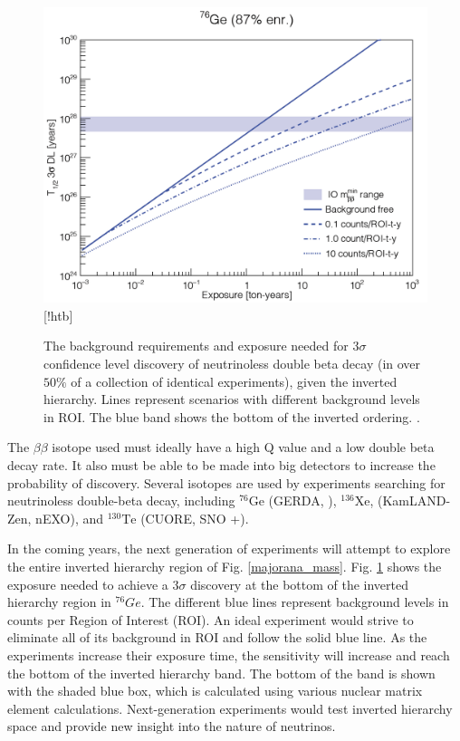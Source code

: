 \begin{figure}[!htb]
\centering
\includegraphics[width=0.8\linewidth]{ch1/figs/exposure_plot.png}[!htb]
\caption{The background requirements and exposure needed for 3$\sigma$ confidence level discovery of neutrinoless double beta decay (in over $50\%$ of a collection of identical experiments), given the inverted hierarchy. Lines represent scenarios with different background levels in ROI. The blue band shows the bottom of the inverted ordering. \cite{Gruszko:2017kfx}.}
\label{exposure_plot}
\end{figure}

The $\beta\beta$ isotope used must ideally have a high Q value and a low double beta decay rate. It also must be able to be made into big detectors to increase the probability of discovery. Several isotopes are used by experiments searching for neutrinoless double-beta decay, including ${}^{76}\mathrm{Ge}$ (GERDA\cite{GERDA_final}, {\MJD}\cite{mjd2013}), ${}^{136}\mathrm{Xe}$, (KamLAND-Zen\cite{KamLAND-Zen:2024eml}, nEXO\cite{nEXO:2021ujk}), and ${}^{130}\mathrm{Te}$ (CUORE\cite{Arnaboldi2002du}, SNO +\cite{SNO_paper}). 


In the coming years, the next generation of experiments will attempt to explore the entire inverted hierarchy region of Fig. \ref{majorana_mass}. Fig. \ref{exposure_plot} shows the exposure needed to achieve a $3\sigma$ discovery at the bottom of the inverted hierarchy region in ${}^{76}Ge$. The different blue lines represent background levels in counts per Region of Interest (ROI). An ideal experiment would strive to eliminate all of its background in ROI and follow the solid blue line. As the experiments increase their exposure time, the sensitivity will increase and reach the bottom of the inverted hierarchy band. The bottom of the band is shown with the shaded blue box, which is calculated using various nuclear matrix element calculations. Next-generation experiments would test inverted hierarchy space and provide new insight into the nature of neutrinos.

